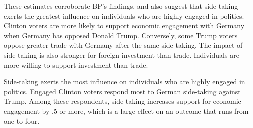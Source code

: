 \documentclass[12pt]{article}
\begin{document}
These estimates corroborate BP's findings, and also suggest that side-taking exerts the greatest influence on individuals who are highly engaged in politics. 
Clinton voters are more likely to support economic engagement with Germany when Germany has opposed Donald Trump. 
Conversely, some Trump voters oppose greater trade with Germany after the same side-taking. 
The impact of side-taking is also stronger for foreign investment than trade. 
Individuals are more willing to support investment than trade.


Side-taking exerts the most influence on individuals who are highly engaged in politics. 
Engaged Clinton voters respond most to German side-taking against Trump. 
Among these respondents, side-taking increases support for economic engagement by .5 or more, which is a large effect on an outcome that runs from one to four. 




\newpage
\singlespace
 
 
\end{document}
